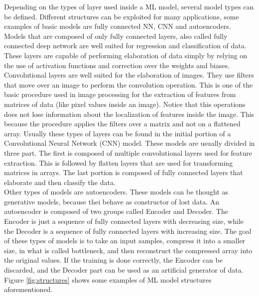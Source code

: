 \documentclass[12pt]{report}
\begin{document}
Depending on the types of layer used inside a ML model, several model types can be defined. Different structures can be exploited for many applications, some examples of basic models are fully connected NN, CNN and autoencoders. \\
Models that are composed of only fully connected layers, also called fully connected deep network are well suited for regression and classification of data. These layers are capable of performing elaboration of data simply by relying on the use of activation functions and correction over the weights and biases. 
Convolutional layers are well suited for the elaboration of images. They use filters that move over an image to perform the convolution operation. This is one of the basic procedure used in image processing for the extraction of features from matrices of data (like pixel values inside an image). Notice that this operations does not lose information about the localization of features inside the image. This because the procedure applies the filters over a matrix and not on a flattened array. Usually these types of layers can be found in the initial portion of a Convolutional Neural Network (CNN) model. These models are usually divided in three part. The first is composed of multiple convolutional layers used for feature extraction. This is followed by flatten layers that are used for transforming matrices in arrays. The last portion is composed of fully connected layers that elaborate and then classify the data.	\\
Other types of models are autoencoders. These models can be thought as generative models, because thei behave as constructor of lost data. An autoencoder is composed of two groups called Encoder and Decoder. The Encoder is just a sequence of fully connected layers with decreasing size, while the Decoder is a sequence of fully connected layers with increasing size. The goal of these types of models is to take an input samples, compress it into a smaller size, in what is called bottleneck, and then reconstruct the compressed array into the original values. If the training is done correctly, the Encoder can be discarded, and the Decoder part can be used as an artificial generator of data.\\
Figure \ref{fig:structures} shows some examples of ML model structures aforementioned.
\end{document}
